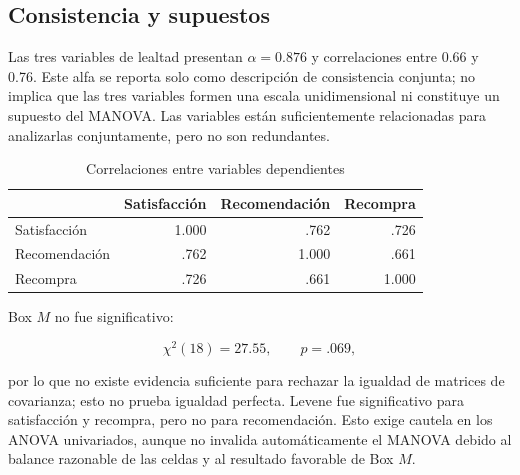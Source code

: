 \documentclass[12pt,letterpaper]{article}
\begin{document}
\begin{table}[H]
\centering
\caption{Medias por tipo de distribución}
\label{tab:p4-medias-distribucion}
\end{table}

\subsection{Consistencia y supuestos}

Las tres variables de lealtad presentan $\alpha=0.876$ y correlaciones entre 0.66 y 0.76. Este alfa se reporta solo como descripción de consistencia conjunta; no implica que las tres variables formen una escala unidimensional ni constituye un supuesto del MANOVA. Las variables están suficientemente relacionadas para analizarlas conjuntamente, pero no son redundantes.


\begin{table}[H]
\centering
\caption{Correlaciones entre variables dependientes}
\label{tab:p4-correlaciones}
\begin{tabular}{lrrr}
\toprule
 & Satisfacción & Recomendación & Recompra \\
\midrule
Satisfacción & 1.000 & .762 & .726 \\
Recomendación & .762 & 1.000 & .661 \\
Recompra & .726 & .661 & 1.000 \\
\bottomrule
\end{tabular}
\end{table}

Box $M$ no fue significativo:

\[
\chi^2(18)=27.55,\qquad p=.069,
\]

por lo que no existe evidencia suficiente para rechazar la igualdad de matrices de covarianza; esto no prueba igualdad perfecta. Levene fue significativo para satisfacción y recompra, pero no para recomendación. Esto exige cautela en los ANOVA univariados, aunque no invalida automáticamente el MANOVA debido al balance razonable de las celdas y al resultado favorable de Box $M$.
\end{document}
